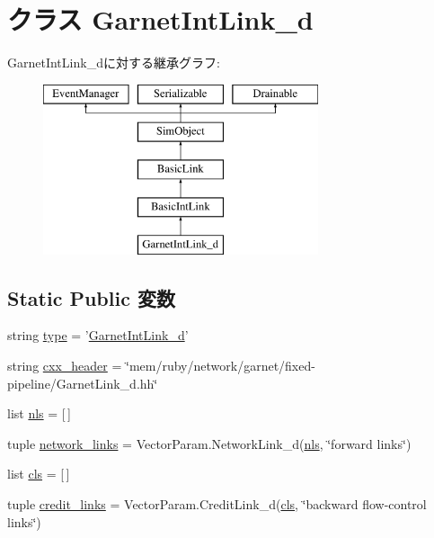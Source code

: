 \hypertarget{classGarnetLink__d_1_1GarnetIntLink__d}{
\section{クラス GarnetIntLink\_\-d}
\label{classGarnetLink__d_1_1GarnetIntLink__d}
}
GarnetIntLink\_\-dに対する継承グラフ:\begin{figure}[H]
\begin{center}
\leavevmode
\includegraphics[height=5cm]{classGarnetLink__d_1_1GarnetIntLink__d}
\end{center}
\end{figure}
\subsection*{Static Public 変数}
\begin{DoxyCompactItemize}
\item 
string \hyperlink{classGarnetLink__d_1_1GarnetIntLink__d_acce15679d830831b0bbe8ebc2a60b2ca}{type} = '\hyperlink{classGarnetLink__d_1_1GarnetIntLink__d}{GarnetIntLink\_\-d}'
\item 
string \hyperlink{classGarnetLink__d_1_1GarnetIntLink__d_a17da7064bc5c518791f0c891eff05fda}{cxx\_\-header} = \char`\"{}mem/ruby/network/garnet/fixed-\/pipeline/GarnetLink\_\-d.hh\char`\"{}
\item 
list \hyperlink{classGarnetLink__d_1_1GarnetIntLink__d_af11789bfc44615f3244deb3cf6054da9}{nls} = \mbox{[}$\,$\mbox{]}
\item 
tuple \hyperlink{classGarnetLink__d_1_1GarnetIntLink__d_a8bbf0848b3bec491562615b151d5c318}{network\_\-links} = VectorParam.NetworkLink\_\-d(\hyperlink{classGarnetLink__d_1_1GarnetIntLink__d_af11789bfc44615f3244deb3cf6054da9}{nls}, \char`\"{}forward links\char`\"{})
\item 
list \hyperlink{classGarnetLink__d_1_1GarnetIntLink__d_ac7f071e45f9ddbded3db29efda614876}{cls} = \mbox{[}$\,$\mbox{]}
\item 
tuple \hyperlink{classGarnetLink__d_1_1GarnetIntLink__d_a1cb258d6b6f19b0fe2d904ca97ebd474}{credit\_\-links} = VectorParam.CreditLink\_\-d(\hyperlink{classGarnetLink__d_1_1GarnetIntLink__d_ac7f071e45f9ddbded3db29efda614876}{cls}, \char`\"{}backward flow-\/control links\char`\"{})
\end{DoxyCompactItemize}


